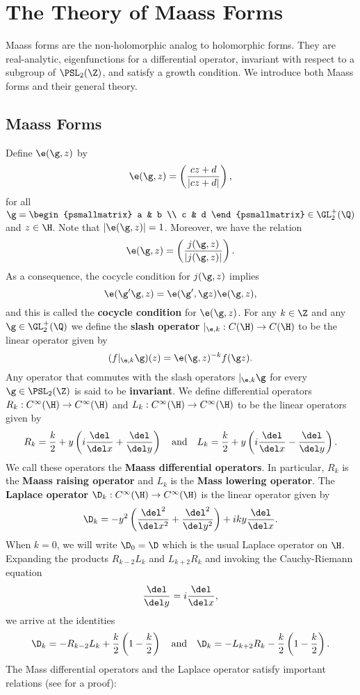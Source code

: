\chapter{The Theory of Maass Forms}
	Maass forms are the non-holomorphic analog to holomorphic forms. They are real-analytic, eigenfunctions for a differential operator, invariant with respect to a subgroup of $\PSL_{2}(\Z)$, and satisfy a growth condition. We introduce both Maass forms and their general theory.
  \section{Maass Forms}
    Define $\e(\g,z)$ by
    \[
      \e(\g,z) = \left(\frac{cz+d}{|cz+d|}\right),
    \]
    for all $\g = \begin{psmallmatrix} a & b \\ c & d \end{psmallmatrix} \in \GL_{2}^{+}(\Q)$ and $z \in \H$. Note that $|\e(\g,z)| = 1$. Moreover, we have the relation
    \[
      \e(\g,z) = \left(\frac{j(\g,z)}{|j(\g,z)|}\right).
    \]
    As a consequence, the cocycle condition for $j(\g,z)$ implies
    \[
      \e(\g'\g,z) =  \e(\g',\g z)\e(\g,z),
    \]
    and this is called the \textbf{cocycle condition} for $\e(\g,z)$. For any $k \in \Z$ and any $\g \in \GL_{2}^{+}(\Q)$ we define the \textbf{slash operator} $|_{\e,k}:C(\H) \to C(\H)$ to be the linear operator given by
    \[
      (f|_{\e,k}\g)(z) = \e(\g,z)^{-k}f(\g z).
    \]
    Any operator that commutes with the slash operators $|_{\e,k}\g$ for every $\g \in \PSL_{2}(\Z)$ is said to be \textbf{invariant}. We define differential operators $R_{k}:C^{\infty}(\H) \to C^{\infty}(\H)$ and $L_{k}:C^{\infty}(\H) \to C^{\infty}(\H)$ to be the linear operators given by
    \[
      R_{k} = \frac{k}{2}+y\left(i\frac{\del}{\del x}+\frac{\del}{\del y}\right) \quad \text{and} \quad L_{k} = \frac{k}{2}+y\left(i\frac{\del}{\del x}-\frac{\del}{\del y}\right).
    \]
    We call these operators the \textbf{Maass differential operators}. In particular, $R_{k}$ is the \textbf{Maass raising operator} and $L_{k}$ is the \textbf{Mass lowering operator}. The \textbf{Laplace operator} $\D_{k}:C^{\infty}(\H) \to C^{\infty}(\H)$ is the linear operator given by
    \[
      \D_{k} = -y^{2}\left(\frac{\del^{2}}{\del x^{2}}+\frac{\del^{2}}{\del y^{2}}\right)+iky\frac{\del}{\del x}.
    \]
    When $k = 0$, we will write $\D_{0} = \D$ which is the usual Laplace operator on $\H$. Expanding the products $R_{k-2}L_{k}$ and $L_{k+2}R_{k}$ and invoking the Cauchy-Riemann equation
    \[
      \frac{\del}{\del y} = i\frac{\del}{\del x},
    \]
    we arrive at the identities
    \[
      \D_{k} = -R_{k-2}L_{k}+\frac{k}{2}\left(1-\frac{k}{2}\right) \quad \text{and} \quad \D_{k} = -L_{k+2}R_{k}-\frac{k}{2}\left(1-\frac{k}{2}\right).
    \]
     The Mass differential operators and the Laplace operator satisfy important relations (see \cite{bumpautomorphic1997} for a proof):

